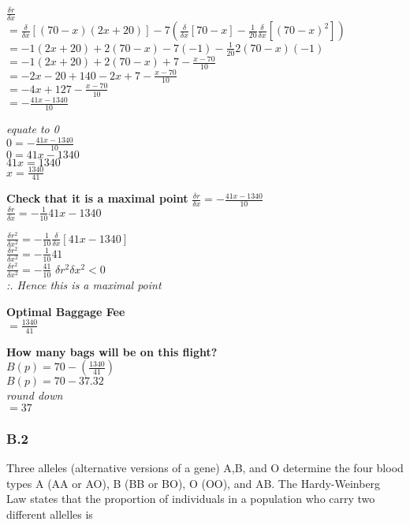 \documentclass[11pt]{article}
\begin{document}
\(\frac {\delta r}{\delta x}\)\\
\(= \frac {\delta}{\delta x}[(70-x)(2x+20)] - 7(\frac {\delta}{\delta x}[70-x] - \frac{1}{20}\frac {\delta}{\delta x}[(70-x)^2])\)\\
\(= -1(2x+20)+2(70-x)-7(-1)-\frac{1}{20}2(70-x)(-1)\)\\
\(= -1(2x+20)+2(70-x)+7-\frac{x-70}{10}\)\\
\(= -2x-20+140-2x+7-\frac{x-70}{10}\)\\
\(= -4x+127-\frac{x-70}{10}\)\\
\(= -\frac{41x-1340}{10}\)

\emph{equate to 0}\\
\(0 = -\frac{41x-1340}{10}\)\\
\(0 = 41x-1340\)\\
\(41x=1340\)\\
\(x=\frac{1340}{41}\)

\textbf{Check that it is a maximal point}
\(\frac {\delta r}{\delta x}= -\frac{41x-1340}{10}\)\\
\(\frac {\delta r}{\delta x}= -\frac{1}{10}41x-1340\)

\(\frac {\delta r^2}{\delta x^2} = -\frac{1}{10}\frac{\delta}{\delta x}[41x-1340]\)\\
\(\frac {\delta r^2}{\delta x^2} = -\frac{1}{10}41\)\\
\(\frac {\delta r^2}{\delta x^2} = -\frac{41}{10}\)
\({\delta r^2}{\delta x^2} < 0\)\\
\emph{:. Hence this is a maximal point}

\textbf{Optimal Baggage Fee}\\
\(=\frac{1340}{41}\)

\textbf{How many bags will be on this flight?}\\
\(B(p) = 70 - (\frac{1340}{41})\)\\
\(B(p) = 70 - 37.32\)\\
\emph{round down}\\
\(= 37\)

    \subsubsection{B.2}\label{b.2}

Three alleles (alternative versions of a gene) A,B, and O determine the
four blood types A (AA or AO), B (BB or BO), O (OO), and AB. The
Hardy-Weinberg Law states that the proportion of individuals in a
population who carry two different allelles is
\end{document}
